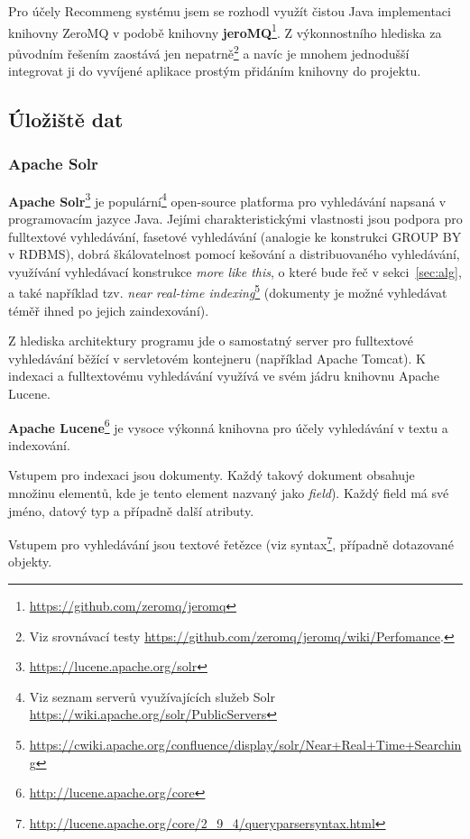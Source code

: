 \documentclass[thesis=M,czech]{FITthesis}[2014/05/07]
\begin{document}
Pro účely Recommeng systému jsem se rozhodl využít čistou Java implementaci knihovny ZeroMQ v podobě knihovny \textbf{jeroMQ}\footnote{\url{https://github.com/zeromq/jeromq}}. Z výkonnostního hlediska za původním řešením zaostává jen nepatrně\footnote{Viz srovnávací testy \url{https://github.com/zeromq/jeromq/wiki/Perfomance}.} a navíc je mnohem jednodušší integrovat ji do vyvíjené aplikace prostým přidáním knihovny do projektu.

\subsection{Úložiště dat}

\subsubsection{Apache Solr}
\textbf{Apache Solr}\footnote{\url{https://lucene.apache.org/solr}} je populární\footnote{Viz seznam serverů využívajících služeb Solr \url{https://wiki.apache.org/solr/PublicServers}} open-source platforma pro vyhledávání napsaná v programovacím jazyce Java. Jejími charakteristickými vlastnosti jsou podpora pro fulltextové vyhledávání, fasetové vyhledávání (analogie ke konstrukci GROUP BY v RDBMS), dobrá škálovatelnost pomocí kešování a distribuovaného vyhledávání, využívání vyhledávací konstrukce \emph{more like this}, o které bude řeč v sekci~\ref{sec:alg}, a také například tzv. \emph{near real-time indexing}\footnote{\url{https://cwiki.apache.org/confluence/display/solr/Near+Real+Time+Searching}} (dokumenty je možné vyhledávat téměř ihned po jejich zaindexování).

Z hlediska architektury programu jde o samostatný server pro fulltextové vyhledávání běžící v servletovém kontejneru (například Apache Tomcat). K indexaci a fulltextovému vyhledávání využívá ve svém jádru knihovnu Apache Lucene. 

\textbf{Apache Lucene}\footnote{\url{http://lucene.apache.org/core}} je vysoce výkonná knihovna pro účely vyhledávání v textu a indexování.

Vstupem pro indexaci jsou dokumenty. Každý takový dokument obsahuje množinu elementů, kde je tento element nazvaný jako \emph{field}). Každý field má své jméno, datový typ a případně další atributy.

Vstupem pro vyhledávání jsou textové řetězce (viz syntax\footnote{\url{http://lucene.apache.org/core/2_9_4/queryparsersyntax.html}}, případně dotazované objekty.
\end{document}
